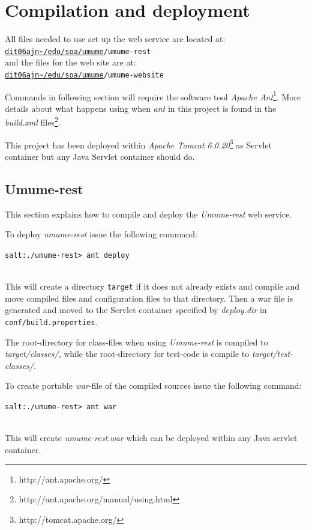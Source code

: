 \documentclass[titlepage, twocolumn, a4paper, 10pt]{article}
\def\pathtocode{\url{dit06ajn~/edu/soa/umume}}
\begin{document}

\section{Compilation and deployment}\label{sec:compile}
All files needed to use set up the web service are located at:\\
\texttt{\pathtocode/umume-rest}\\
and the files for the web site are at:\\
\texttt{\pathtocode/umume-website}

Commands in following section will require the software tool
\textit{Apache Ant}\footnote{http://ant.apache.org/}. More details
about what happens using when \textit{ant} in this project is found in
the \textit{build.xml} files\footnote{http://ant.apache.org/manual/using.html}.

This project has been deployed within \textit{Apache Tomcat
  6.0.20}\footnote{http://tomcat.apache.org/} as Servlet container but
any Java Servlet container should do.

\subsection{Umume-rest}
This section explains how to compile and deploy the
\textit{Umume-rest} web service.

To deploy \textit{umume-rest} issue the following command:\\
\begin{footnotesize}
  \verb!salt:./umume-rest> ant deploy!
\end{footnotesize}\\
This will create a directory \verb!target! if it does not already
exists and compile and move compiled files and configuration files to
that directory. Then a war file is generated and moved to the Servlet
container specified by \textit{deploy.dir} in
\texttt{conf/build.properties}.

The root-directory for class-files when using \textit{Umume-rest} is
compiled to \textit{target/classes/}, while the root-directory for
test-code is compile to \textit{target/test-classes/}.

To create portable \textit{war}-file of the compiled sources issue the
following command:\\
\begin{footnotesize}
  \verb!salt:./umume-rest> ant war!
\end{footnotesize}\\
This will create \textit{umume-rest.war} which can be deployed within
any Java servlet container.
\end{document}
